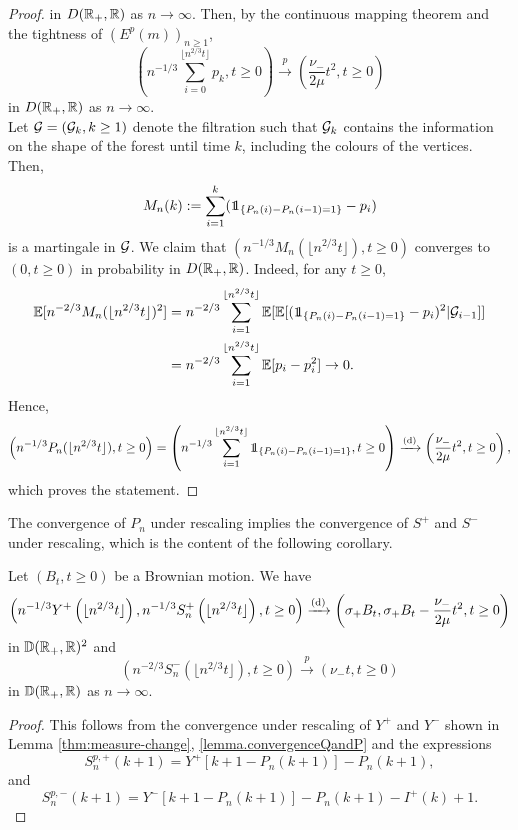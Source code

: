 \begin{proof}
in $D({\mathbb R}_+,{\mathbb R})$ as $n\to \infty$. 
Then, by the continuous mapping theorem and the tightness of $(E^p(m))_{n\geq 1}$,
$$\left(n^{-1/3}\sum_{i=0}^{\lfloor n^{2/3}t \rfloor} p_k , t \geq 0\right)\overset{p}{\to} \left(\frac{\nu_-}{2\mu}t^2,t\geq 0\right)$$
in $D({\mathbb R}_+,{\mathbb R})$ as $n\to \infty$. \\
Let ${\mathcal G}=({\mathcal G}_k,k\geq 1)$ denote the filtration such that ${\mathcal G}_{k}$ contains the information on the shape of the forest until time $k$, including the colours of the vertices. Then, 
$$M_n(k):=\sum_{i=1}^k (\one_{\{P_n(i)-P_n(i-1)=1\}}-p_i)$$ is a martingale in ${\mathcal G}$. We claim that $(n^{-1/3}M_n(\lfloor n^{2/3} t\rfloor ), t\geq 0)$ converges to $(0,t\geq 0)$ in probability in $D({\mathbb R}_+,{\mathbb R})$. Indeed, for any $t\geq 0$,
\begin{align*}\E[n^{-2/3}M_n(\lfloor n^{2/3} t\rfloor )^2]&=n^{-2/3}\sum_{i=1}^{\lfloor n^{2/3} t\rfloor} \E[\E[(\one_{\{P_n(i)-P_n(i-1)=1\}}-p_i)^2|\cG_{i-1}]]\\&=n^{-2/3}\sum_{i=1}^{\lfloor n^{2/3} t\rfloor} \E[p_i-p_i^2]\to 0.\end{align*}
Hence,
$$\left(n^{-1/3}P_n(\lfloor n^{2/3}t\rfloor), t\geq 0\right)=\left(n^{-1/3}\sum_{i=1}^{\lfloor n^{2/3}t\rfloor}  \one_{\{P_n(i)-P_n(i-1)=1\}}  , t\geq 0\right)\todist \left( \frac{\nu_-}{2\mu}t^2, t\geq 0 \right),$$
 which proves the statement.

\end{proof}

The convergence of $P_n$ under rescaling implies the convergence of $S^{+}$ and $S^{-}$ under rescaling, which is the content of the following corollary. 

\begin{corollary}\label{cor.lukasiewiczpathpurplevertices}
 Let $(B_t,t\geq 0)$ be a Brownian motion. We have 
 \begin{align*}\left(n^{-1/3}Y^{+}\left(\lfloor n^{2/3}t\rfloor\right), n^{-1/3}S^{+}_n\left(\lfloor n^{2/3}t\rfloor\right), t\geq 0\right)\xrightarrow[]{\mathrm{(d)}}\left(\sigma_+B_t,\sigma_+B_t-\frac{\nu_-}{2\mu}t^2,  t\geq 0\right)\end{align*}
 in ${\mathbb D}({\mathbb R}_+,{\mathbb R})^2$  and 
 $$\left(n^{-2/3}S^{-}_n\left(\lfloor n^{2/3}t\rfloor\right),t\geq 0\right)\overset{p}{\to}\left(\nu_- t,t\geq 0\right)$$
 in ${\mathbb D}({\mathbb R}_+,{\mathbb R})$ as $n\to\infty$.
\end{corollary}
\begin{proof}
 This follows from the convergence under rescaling of $Y^+$ and $Y^-$ shown in Lemma \ref{thm:measure-change}, \ref{lemma.convergenceQandP} and the expressions 
 $$S_n^{p,+}(k+1)=Y^+\left[k+1-P_n(k+1)\right]-P_n(k+1),$$ and $$S_n^{p,-}(k+1)=Y^-\left[k+1-P_n(k+1)\right]-P_n(k+1)-I^{+}(k)+1.$$
\end{proof}

